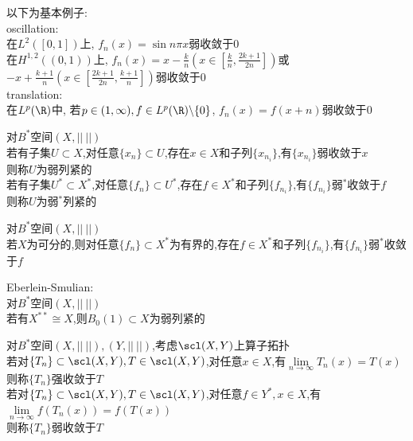 \begin{zhu}
以下为基本例子:\\
oscillation:\\
在$L^2([0,1])$上, $f_n(x)=\sin n\pi x$弱收敛于$0$\\
在$H^{1,2}((0,1))$上, $f_n(x)=x-\frac{k}{n} (x\in[\frac{k}{n},\frac{2k+1}{2n}])$或$-x+\frac{k+1}{n} (x\in[\frac{2k+1}{2n},\frac{k+1}{n}])$弱收敛于$0$\\
translation:\\
在$L^{p}(\R)$中, 若$p\in(1,\infty),f\in L^{p}(\R)\backslash\{0\}$, $f_n(x)=f(x+n)$弱收敛于$0$
\end{zhu}

\begin{dingyi}
对$B^*$空间$(X,||\ ||)$\\
若有子集$U\subset X$,对任意$\{x_n\}\subset U$,存在$x\in X$和子列$\{x_{n_{i}}\}$,有$\{x_{n_{i}}\}$弱收敛于$x$\\
则称$U$为弱列紧的\\
若有子集$U^{*}\subset X^{*}$,对任意$\{f_n\}\subset U^{*}$,存在$f\in X^{*}$和子列$\{f_{n_i}\}$,有$\{f_{n_i}\}$弱$^{*}$收敛于$f$\\
则称$U$为弱$^{*}$列紧的
\end{dingyi}

\begin{dingli}
对$B^*$空间$(X,||\ ||)$\\
若$X$为可分的,则对任意$\{f_n\}\subset X^{*}$为有界的,存在$f\in X^{*}$和子列$\{f_{n_i}\}$,有$\{f_{n_i}\}$弱$^{*}$收敛于$f$
\end{dingli}

\begin{dingli}
Eberlein-Smulian:\\
对$B^*$空间$(X,||\ ||)$\\
若有$X^{**}\cong X$,则$B_{0}(1)\subset X$为弱列紧的
\end{dingli}

\begin{dingyi}
对$B^*$空间$(X,||\ ||),(Y,||\ ||)$,考虑$\scl(X,Y)$上算子拓扑\\
若对$\{T_n\}\subset \scl(X,Y),T\in\scl(X,Y)$,对任意$x\in X$,有$\lim\limits_{n\to\infty}T_n(x)=T(x)$\\
则称$\{T_n\}$强收敛于$T$\\
若对$\{T_n\}\subset \scl(X,Y),T\in\scl(X,Y)$,对任意$f\in Y^{*},x\in X$,有$\lim\limits_{n\to\infty}f(T_n(x))=f(T(x))$\\
则称$\{T_n\}$弱收敛于$T$
\end{dingyi}

